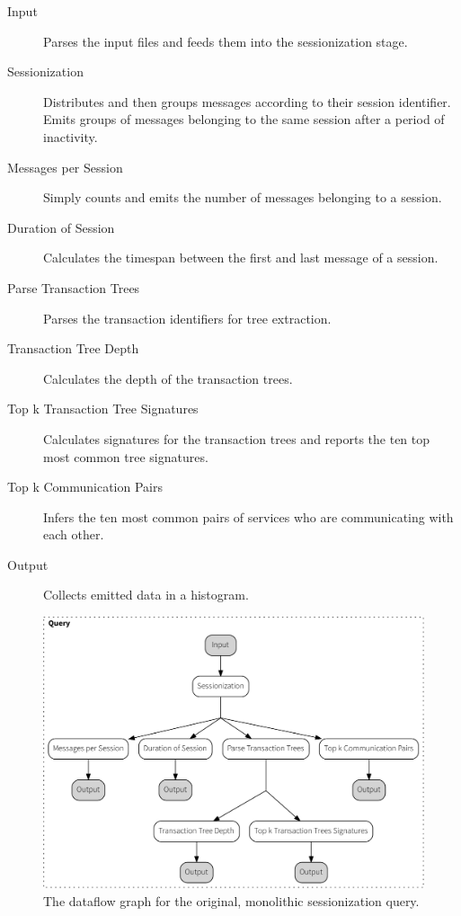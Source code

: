 \begin{description}
\item [Input] Parses the input files and feeds them into the sessionization stage.
\item [Sessionization] Distributes and then groups messages according to their session identifier.
Emits groups of messages belonging to the same session after a period of inactivity.
\item [Messages per Session] Simply counts and emits the number of messages belonging to a session.
\item [Duration of Session] Calculates the timespan between the first and last message of a session.
\item [Parse Transaction Trees] Parses the transaction identifiers for tree extraction.
\item [Transaction Tree Depth] Calculates the depth of the transaction trees.
\item [Top k Transaction Tree Signatures] Calculates signatures for the transaction trees and
reports the ten top most common tree signatures.
\item [Top k Communication Pairs] Infers the ten most common pairs of services who are
communicating with each other.
\item [Output] Collects emitted data in a histogram.
\end{description}

\begin{figure}[p]
  \centering
    \includegraphics[width=1\textwidth]{figures/sessionize_dataflow-crop}
  \caption[Dataflow graph for monolithic sessionization]{The dataflow graph
  for the original, monolithic sessionization query.}
  \label{fig:monolith}
\end{figure}

